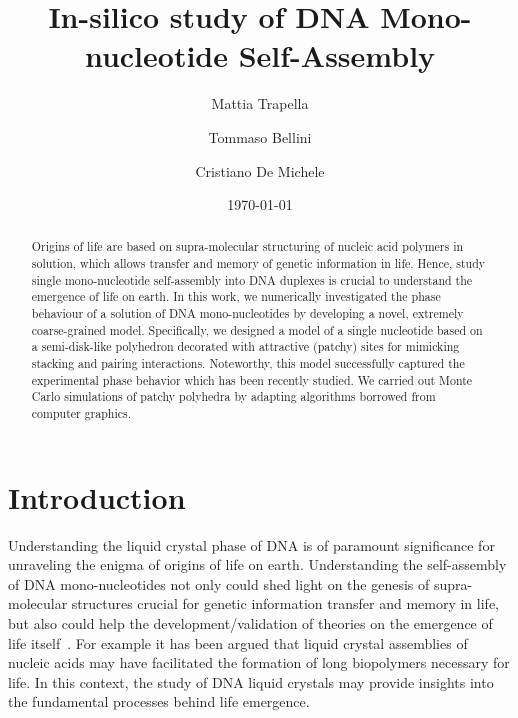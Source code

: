 \documentclass[aip,jcp, amsmath, amssymb, reprint]{revtex4-1}
\begin{document}
\title{In-silico study of DNA Mono-nucleotide Self-Assembly}
\date{\today}

\author{Mattia Trapella}

\author{Tommaso Bellini}
\author{Cristiano De Michele}

\begin{abstract}
  Origins of life are based on supra-molecular structuring
  of nucleic acid polymers in solution, which allows transfer and memory of genetic information in life. 
  Hence, study single mono-nucleotide self-assembly into DNA duplexes is crucial to understand 
  the emergence of life on earth.
  In this work, we numerically investigated the phase behaviour of a solution of DNA
  mono-nucleotides by developing a novel, extremely coarse-grained model. Specifically, 
  we designed a model of a single nucleotide based on a semi-disk-like polyhedron decorated with attractive 
  (patchy) sites for mimicking stacking and pairing interactions. Noteworthy, 
  this model successfully captured the experimental phase behavior which has been recently studied.
  We carried out Monte Carlo simulations of patchy polyhedra by adapting algorithms borrowed 
  from computer graphics.%
\end{abstract}

\maketitle


\section{Introduction}
Understanding the liquid crystal phase of DNA is of paramount significance for unraveling the enigma of origins of life
on earth. Understanding the self-assembly of DNA mono-nucleotides not only could shed light on the genesis of 
supra-molecular structures crucial for genetic information transfer and memory in life, but also could help the 
development/validation of theories on the emergence of life itself~\cite{Jia}. 
For example it has been argued that  liquid crystal assemblies of nucleic acids may have facilitated the formation 
of long biopolymers necessary for life. In this context, the study of DNA liquid crystals may provide 
insights into the fundamental processes behind life emergence.  \\
\end{document}
